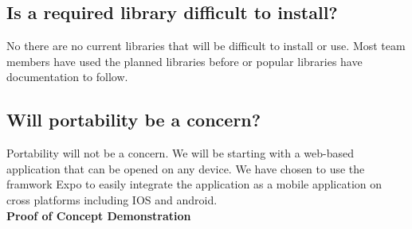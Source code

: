 \documentclass{article}
\begin{document}
\subsection{Is a required library difficult to install?}
No there are no current libraries that will be difficult to install or use. Most
team members have used the planned libraries before or popular libraries have documentation to
follow.\\

\pagebreak

\subsection{Will portability be a concern?}
Portability will not be a concern. We will be starting with a web-based application that can be opened on any device. We have chosen to use the framwork Expo to easily integrate the application as a mobile application on cross platforms including IOS and android.\\


\textbf{Proof of Concept Demonstration}\\
\end{document}
